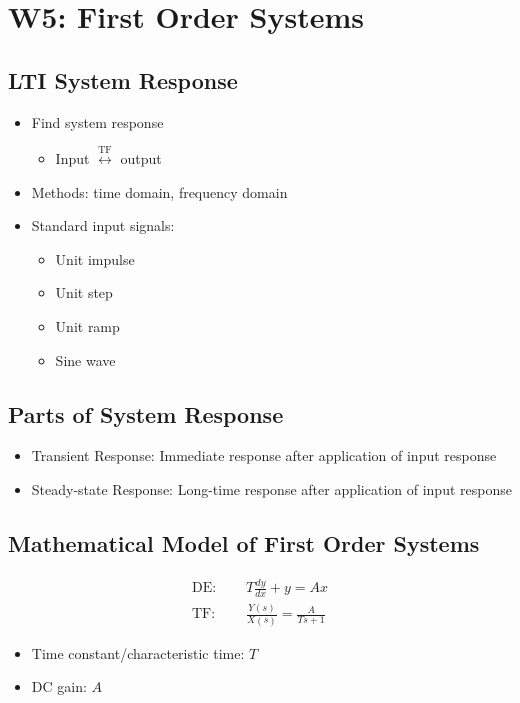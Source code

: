 \documentclass[a4paper]{article}
\begin{document}
\newpage
\section{W5:  First Order Systems}
\subsection{LTI System Response}
\begin{itemize}
    \item Find system response
    \begin{itemize}[label=$\circ$]
        \item Input $\stackrel{\mathrm{TF}}{\longleftrightarrow}$ output
    \end{itemize}
    \item Methods: time domain, frequency domain
    \item Standard input signals:
    \begin{itemize}[label=$\circ$]
        \item Unit impulse
        \item Unit step
        \item Unit ramp
        \item Sine wave
    \end{itemize}
\end{itemize}
\subsection{Parts of System Response}
\begin{itemize}
    \item Transient Response: Immediate response after application of input response
    \item Steady-state Response: Long-time response after application of input response
\end{itemize}
\subsection{Mathematical Model of First Order Systems}
\begin{align*}
    \text{DE: }&\quad T\frac{dy}{dx}+y=Ax\\
    \text{TF: }&\quad \frac{Y(s)}{X(s)} = \frac{A}{Ts+1}
\end{align*}
\begin{itemize}
    \item Time constant/characteristic time: $T$
    \item DC gain: $A$
\end{itemize}
\end{document}
